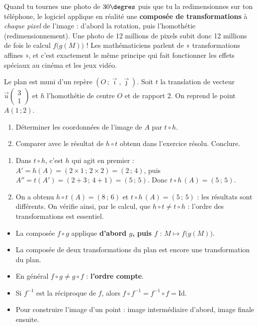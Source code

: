 \documentclass[11pt]{article}
\begin{document}
\begin{savaistu}
Quand tu tournes une photo de $30\degres$ puis que tu la redimensionnes sur ton téléphone, le logiciel applique en réalité une \textbf{composée de transformations} à \emph{chaque pixel} de l'image : d'abord la rotation, puis l'homothétie (redimensionnement). Une photo de 12 millions de pixels subit donc 12 millions de fois le calcul $f\big(g(M)\big)$ ! Les mathématiciens parlent de « transformations affines », et c'est exactement le même principe qui fait fonctionner les effets spéciaux au cinéma et les jeux vidéo.
\end{savaistu}

\begin{exercice}
Le plan est muni d'un repère $(O\,;\vec{\imath},\vec{\jmath})$. Soit $t$ la translation de vecteur $\vec{u}\begin{pmatrix} 3 \\ 1 \end{pmatrix}$ et $h$ l'homothétie de centre $O$ et de rapport $2$. On reprend le point $A(1\,;2)$.
\begin{enumerate}
\item Déterminer les coordonnées de l'image de $A$ par $t \circ h$.
\item Comparer avec le résultat de $h \circ t$ obtenu dans l'exercice résolu. Conclure.
\end{enumerate}
\end{exercice}

\begin{corrige}[Exercice]
\begin{enumerate}
\item Dans $t \circ h$, c'est $h$ qui agit en premier : $A' = h(A) = (2\times 1\,;\,2\times 2) = (2\,;\,4)$, puis $A'' = t(A') = (2+3\,;\,4+1) = (5\,;\,5)$. Donc $t \circ h\,(A) = (5\,;\,5)$.
\item On a obtenu $h \circ t\,(A) = (8\,;\,6)$ et $t \circ h\,(A) = (5\,;\,5)$ : les résultats sont différents. On vérifie ainsi, par le calcul, que $h \circ t \neq t \circ h$ : l'ordre des transformations est essentiel.
\end{enumerate}
\end{corrige}

\begin{aretenir}
\begin{itemize}
\item La composée $f \circ g$ applique \textbf{d'abord $g$, puis $f$} : $M \mapsto f\big(g(M)\big)$.
\item La composée de deux transformations du plan est encore une transformation du plan.
\item En général $f \circ g \neq g \circ f$ : \textbf{l'ordre compte}.
\item Si $f^{-1}$ est la réciproque de $f$, alors $f \circ f^{-1} = f^{-1} \circ f = \mathrm{Id}$.
\item Pour construire l'image d'un point : image intermédiaire d'abord, image finale ensuite.
\end{itemize}
\end{aretenir}
\end{document}

